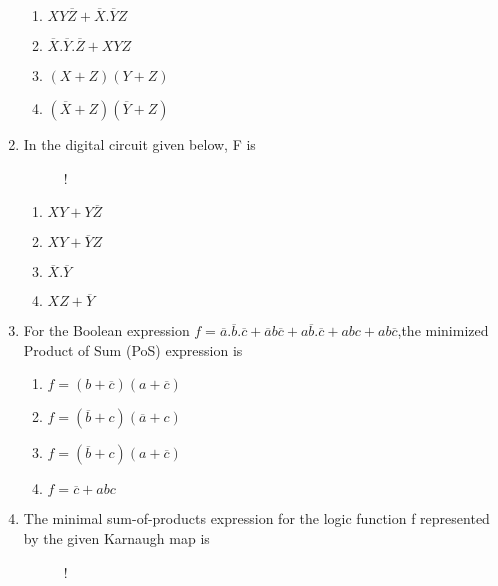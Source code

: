 \documentclass[journal,12pt,twocolumn]{IEEEtran}
\begin{document}
\begin{enumerate}
    \begin{enumerate}
      \item $XY\overline{Z}+\overline{X}.\overline{Y}Z$ 
      \item $\overline{X}.\overline{Y}.\overline{Z}+XYZ$
      \item $(X+Z)(Y+Z)$
      \item $(\overline{X}+Z)(\overline{Y}+Z)$
    \end{enumerate}
    \item In the digital circuit given below, F is
\begin{figure}[!h]
\centering
\resizebox {\columnwidth} {!} {

}
\caption{}
\end{figure} 
                        \begin{enumerate}
      \item $XY+Y\overline{Z}$ 
      \item $XY+\overline{Y}Z$
      \item $\overline{X}.\overline{Y}$
      \item $XZ+\overline{Y}$
    \end{enumerate}
    \item For the Boolean expression $f=\overline{a}.\overline{b}.\overline{c}+\overline{a}b\overline{c}+a\overline{b}.\overline{c}+abc+ab\overline{c}$,the minimized Product of Sum (PoS) expression is 
    \begin{enumerate}
      \item $f=(b+\overline{c})(a+\overline{c})$ 
      \item $f=(\overline{b}+c)(\overline{a}+c)$
      \item $f=(\overline{b}+c)(a+\overline{c})$
      \item $f=\overline{c}+abc$
     \end{enumerate}
     \item The minimal sum-of-products expression for the logic function f represented
by the given Karnaugh map is
\begin{figure}[!h]
\centering
\resizebox {\columnwidth} {!} {

}
\caption{}

\end{figure}
\end{enumerate}
\end{document}
